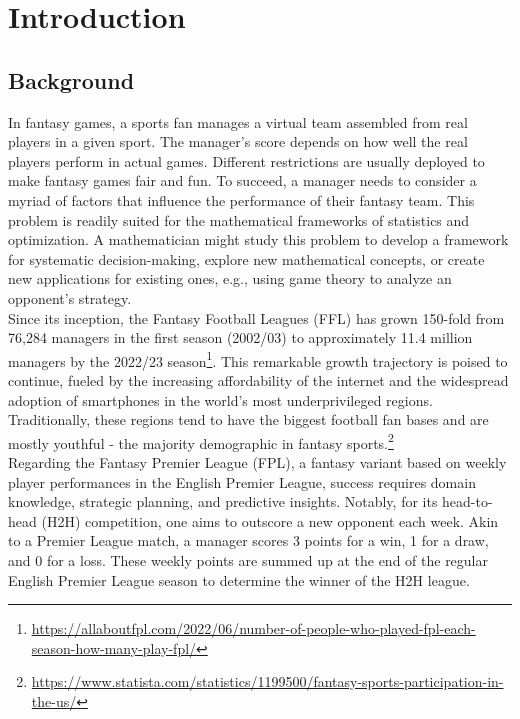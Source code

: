 	\newpage
	\tableofcontents

	\mainmatter
	\chapter{Introduction}
		\section{Background}
			In fantasy games, a sports fan manages a virtual team assembled from real players in a given sport. The manager’s score depends on how well the real players perform in actual games. Different restrictions are usually deployed to make fantasy games fair and fun. To succeed, a manager needs to consider a myriad of factors that influence the performance of their fantasy team. This problem is readily suited for the mathematical frameworks of statistics and optimization. A mathematician might study this problem to develop a framework for systematic decision-making, explore new mathematical concepts, or create new applications for existing ones, e.g., using game theory to analyze an opponent’s strategy.
			\\

			Since its inception, the Fantasy Football Leagues (FFL) has grown 150-fold from 76,284 managers in the first season (2002/03) to approximately 11.4 million managers by the 2022/23 season\footnote{\url{https://allaboutfpl.com/2022/06/number-of-people-who-played-fpl-each-season-how-many-play-fpl/}}. This remarkable growth trajectory is poised to continue, fueled by the increasing affordability of the internet and the widespread adoption of smartphones in the world’s most underprivileged regions. Traditionally, these regions tend to have the biggest football fan bases and are mostly youthful - the majority demographic in fantasy sports.\footnote{\url{https://www.statista.com/statistics/1199500/fantasy-sports-participation-in-the-us/}}
			\\

			Regarding the Fantasy Premier League (FPL), a fantasy variant based on weekly player performances in the English Premier League, success requires domain knowledge, strategic planning, and predictive insights. Notably, for its head-to-head (H2H) competition, one aims to outscore a new opponent each week. Akin to a Premier League match, a manager scores 3 points for a win, 1 for a draw, and 0 for a loss. These weekly points are summed up at the end of the regular English Premier League season to determine the winner of the H2H league.

